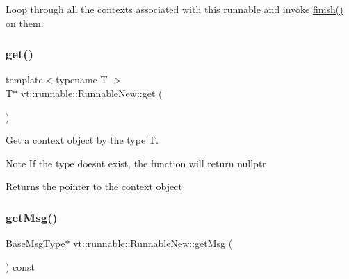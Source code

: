 Loop through all the contexts associated with this runnable and invoke {\ttfamily \hyperlink{structvt_1_1runnable_1_1_runnable_new_a44e2f15795876230e49c343b64c1414c}{finish()}} on them. 

\mbox{\label{structvt_1_1runnable_1_1_runnable_new_a140176f3b035d504ad1e726e3c7b09fa}} 
\subsubsection{\texorpdfstring{get()}{get()}}
{\footnotesize\ttfamily template$<$typename T $>$ \\
T$\ast$ vt\+::runnable\+::\+Runnable\+New\+::get (\begin{DoxyParamCaption}{ }\end{DoxyParamCaption})}



Get a context object by the type {\ttfamily T}. 

\begin{DoxyNote}{Note}
If the type doesn\textquotesingle{}t exist, the function will return {\ttfamily nullptr} 
\end{DoxyNote}
\begin{DoxyReturn}{Returns}
the pointer to the context object 
\end{DoxyReturn}
\mbox{\label{structvt_1_1runnable_1_1_runnable_new_aed655dff826a821a3db9162259f33288}} 
\subsubsection{\texorpdfstring{get\+Msg()}{getMsg()}}
{\footnotesize\ttfamily \hyperlink{namespacevt_a44d0d4e144748f2b19a1cfd962f50338}{Base\+Msg\+Type}$\ast$ vt\+::runnable\+::\+Runnable\+New\+::get\+Msg (\begin{DoxyParamCaption}{ }\end{DoxyParamCaption}) const\hspace{0.3cm}{\ttfamily [inline]}}



